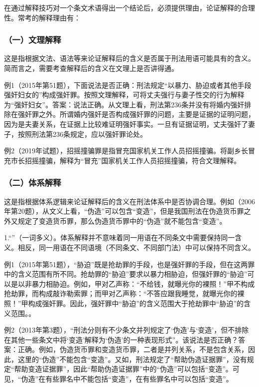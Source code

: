 在通过解释技巧对一个条文术语得出一个结论后，必须提供理由，论证解释的合理性。常考的解释理由有：

\subsubsection*{（一）文理解释}

这是指根据文法、语法等来论证解释后的含义是否属于刑法用语可能具有的含义。简而言之，需要考查解释后的含义在文理上是否讲得通。

例1（2015年第51题），下面说法是否正确：刑法规定“以暴力、胁迫或者其他手段强奸妇女的”构成强奸罪。按照文理解释，可将丈夫强行与妻子性交的行为解释为“强奸妇女”。答案：说法正确。从文理上看，刑法第236条并没有将婚内强奸排除在强奸罪之外。所谓婚内强奸是否构成强奸罪的问题，主要是证据的证明问题，因为是夫妻关系，在证据上比较难证明强奸事实。一旦有证据证明，丈夫强奸了妻子，按照刑法第236条规定，应以强奸罪论处。

例2（2019年试题），招摇撞骗罪是指冒充国家机关工作人员招摇撞骗。将副乡长冒充市长招摇撞骗，解释为“冒充”国家机关工作人员招摇撞骗，符合文理解释。

\subsubsection*{（二）体系解释}

这是指根据体系逻辑来论证解释后的含义在刑法体系中是否协调合理。例如（2006年第20题），从文义上看，“伪造”可以包含“变造”，但是我国刑法在伪造货币罪之外又规定了变造货币罪，那么伪造货币罪中的“伪造”就不能包含“变造”。

1.“”（一词多义）。体系解释并不意味着同一用语在不同条文中需要保持同一含义。相反，同一用语在不同语境（不同条文、不同部门法）中可以保持不同含义。

例1（2015年第51题），“胁迫”既是抢劫罪的手段，也是强奸罪的手段，但在这两罪中的含义范围有所不同。抢劫罪的“胁迫”要求以暴力相胁迫，但强奸罪的“胁迫”可以是以非暴力相胁迫。例如，甲对乙声称：“不给钱，就曝光你的裸照！”甲不构成抢劫罪，而构成敲诈勒索罪；而甲对乙声称：“不答应跟我睡觉，就曝光你的裸照！”甲构成强奸罪。因此，强奸罪中“胁迫”的含义范围大于抢劫罪中“胁迫”的含义范围。。

例2（2013年第3题），“刑法分则有不少条文并列规定了‘伪造’与‘变造’，但不排除在其他一些条文中将‘变造’解释为‘伪造’的一种表现形式”。该说法是否正确？答案：正确。例如，伪造货币罪和变造货币罪，二者是并列关系，不是包含关系，因此，这里的“伪造”不能包含“变造”。又如，刑法规定了“帮助伪造证据罪”，没有规定“帮助变造证据罪”，因此“帮助伪造证据罪”中的“伪造”可以包括“变造”。可见，“伪造”在有些罪名中不能包括“变造”，在有些罪名中可以包括“变造”。

